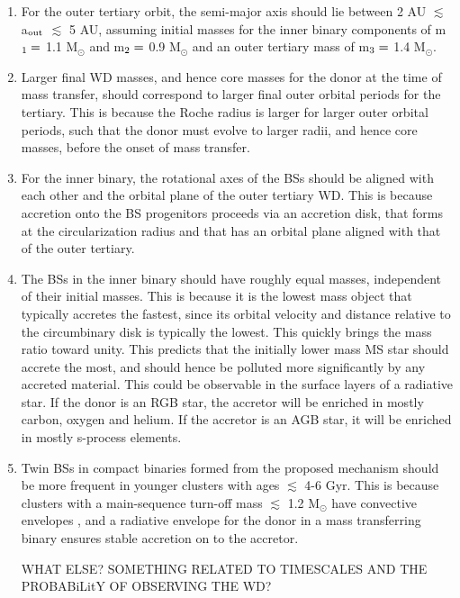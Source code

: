 \documentclass[useAMS,usenatbib]{mnras}
\begin{document}
\begin{enumerate}

\item For the outer tertiary orbit, the semi-major axis should lie between 2 AU $\lesssim$ a$_{\rm out}$ $\lesssim$ 5 AU, assuming initial masses for the inner binary components of m$_{\rm 1} =$ 1.1 M$_{\odot}$ and m$_{\rm 2} =$ 0.9 M$_{\odot}$ and an outer tertiary mass of m$_{\rm 3} =$ 1.4 M$_{\odot}$.

\item Larger final WD masses, and hence core masses for the donor at the time of mass transfer, should correspond to larger final outer orbital periods for the tertiary.  This is because the Roche radius is larger for larger outer orbital periods, such that the donor must evolve to larger radii, and hence core masses, before the onset of mass transfer.

\item For the inner binary, the rotational axes of the BSs should be aligned with each other and the orbital plane of the outer tertiary WD.  This is because accretion onto the BS progenitors proceeds via an accretion disk, that forms at the circularization radius and that has an orbital plane aligned with that of the outer tertiary.

\item The BSs in the inner binary should have roughly equal masses, independent of their initial masses.  This is because it is the lowest mass object that typically accretes the fastest, since its orbital velocity and distance relative to the circumbinary disk is typically the lowest.  This quickly brings the mass ratio toward unity.  This predicts that the initially lower mass MS star should accrete the most, and should hence be polluted more significantly by any accreted material.  This could be observable in the surface layers of a radiative star.  If the donor is an RGB star, the accretor will be enriched in mostly carbon, oxygen and helium.  If the accretor is an AGB star, it will be enriched in mostly s-process elements.

\item Twin BSs in compact binaries formed from the proposed mechanism should be more frequent in younger clusters with ages $\lesssim$ 4-6 Gyr.  This is because clusters with a main-sequence turn-off mass $\lesssim$ 1.2 M$_{\odot}$ have convective envelopes \citep[e.g.][]{iben91,maedoer09}, and a radiative envelope for the donor in a mass transferring binary ensures stable accretion on to the accretor.

WHAT ELSE?  SOMETHING RELATED TO TIMESCALES AND THE PROBABiLitY OF OBSERVING THE WD?

\end{enumerate}
\end{document}
